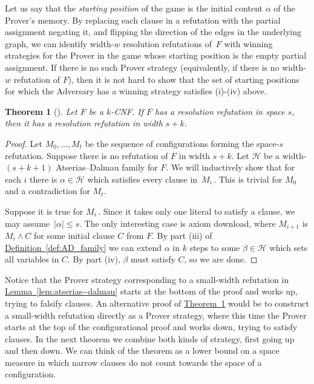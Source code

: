 \documentclass[11pt]{article}
\numberwithin{equation}{section}
\newtheorem{theorem}{Theorem}[section]
\theoremstyle{definition}
\theoremstyle{plain}
\newcommand{\expref}[2]{\hyperref[#2]{#1~\ref{#2}}}
\newcommand\calH{\mathcal{H}}
\begin{document}
Let us say that the \emph{starting position} of the game is
the initial content $\alpha$ of the Prover's memory.
By replacing each clause in a refutation
with the partial assignment negating it, and flipping the 
direction of the edges in the underlying graph,
we can identify width-$w$ resolution refutations of~$F$ with winning strategies for the Prover in the game whose starting position is the empty partial assignment. 
If there is no such Prover strategy (equivalently, if there is 
no width-$w$ refutation of $F$), then it is not 
hard to show that the set of starting positions for
which the Adversary has a winning strategy 
satisfies (i)-(iv) above.




\begin{theorem} [\cite{DBLP:journals/jcss/AtseriasD08}] \label{lem:width_space_resolution}
Let $F$ be a $k$-CNF. If $F$ has a resolution refutation in space $s$, 
then it has a resolution refutation in width $s+k$.
\end{theorem}

\begin{proof}
Let $M_0, \dots, M_t$ be the sequence of configurations forming the 
space-$s$ refutation. 
Suppose there is no refutation of $F$ in width $s+k$. Let $\calH$ be a 
width-$(s+k+1)$ Atserias--Dalmau family for $F$.
We will inductively show that for each $i$ there is $\alpha \in \calH$ 
which satisfies every clause in~$M_i$\,. This is trivial for $M_0$ and a contradiction for $M_t$.

Suppose it is true for $M_i$\,. Since it takes only one literal to satisfy a clause,
we may assume~$|\alpha| \le s$. The only interesting case is axiom download,
where $M_{i+1}$ is $M_i \wedge C$ for some initial clause $C$ from $F$.
By part (iii) of \expref{Definition}{def:AD_family} we can extend $\alpha$ in $k$
steps to some $\beta \in \calH$ which sets all variables in $C$.
By part (iv), $\beta$ must satisfy $C$, so we are done. 
\end{proof}

Notice that the Prover strategy corresponding to a small-width refutation
in \expref{Lemma}{lem:atserias--dalmau}
starts at the bottom of the proof and works up, trying to falsify
clauses.
An alternative proof of \expref{Theorem}{lem:width_space_resolution}
would be to construct a small-width refutation directly as a Prover strategy, where this time
the Prover starts at the top of the configurational proof and works down, trying to
satisfy clauses. In the next theorem we combine both kinds of strategy, first going up and then down.
We can think of the theorem as a lower bound on a space measure
in which narrow clauses do not count towards the space of a configuration.
\end{document}
